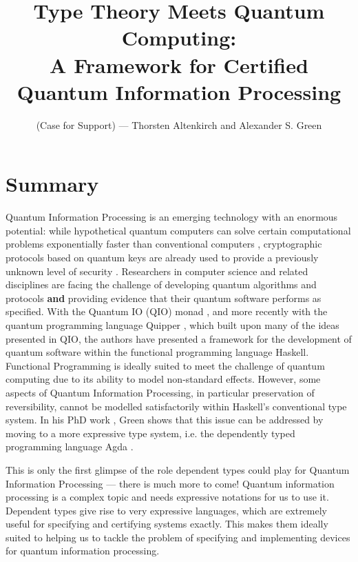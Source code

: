 \documentclass[a4paper]{article}
\title{Type Theory Meets Quantum Computing:\\
 \Large A Framework for Certified Quantum Information Processing
}
\author{(Case for Support) --- Thorsten Altenkirch and Alexander S. Green}
\date{}
\begin{document}
\maketitle
\section*{Summary}
Quantum Information Processing is an emerging technology with an enormous
potential: while hypothetical quantum computers can solve certain
computational problems exponentially faster than conventional
computers ,
cryptographic protocols based on quantum keys  are
already used to provide a previously unknown level of security
. Researchers in
computer science and related disciplines are facing the challenge of
developing quantum algorithms  and protocols \textbf{and}
providing evidence that their quantum software performs as
specified. With the Quantum IO (QIO) monad
, and more recently with the quantum
programming language Quipper ,
which built upon many of the ideas presented in QIO, the authors have
presented a framework for the development of quantum software within
the functional programming language Haskell. Functional
Programming is ideally suited to meet the challenge of quantum
computing due to its ability to model
non-standard effects. However, some aspects of Quantum Information Processing,
in particular preservation of reversibility, cannot be modelled satisfactorily
within Haskell's conventional type system. In his PhD work
, Green shows that this issue can be addressed
by moving to a more expressive type system, i.e. the dependently typed
programming language Agda . 

This is only the first glimpse of the role dependent types could play
for Quantum Information Processing --- there is much more to come!
Quantum information processing is a complex topic and needs expressive
notations for us to use it. Dependent types give rise to very expressive
languages, which are extremely useful for specifying and certifying systems exactly.
This makes them ideally suited to helping us to tackle the
problem of specifying and implementing devices for quantum information
processing. 

\end{document}

